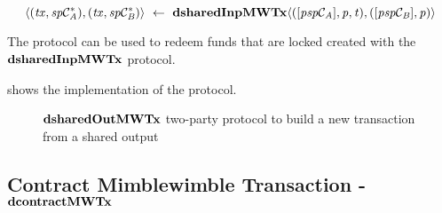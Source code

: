 \[ \langle (\mathit{tx}, \mathit{sp}\mathcal{C}_{\mathit{A}}^*), (\mathit{tx}, \mathit{sp}\mathcal{C}_{\mathit{B}}^*) \rangle ~\leftarrow~ \mathbf{dsharedInpMWTx} \langle([\mathit{psp}\mathcal{C}_{\mathit{A}}],\mathit{p},\mathit{t}), ([\mathit{psp}\mathcal{C}_{\mathit{B}}],\mathit{p}) \rangle \]

The protocol can be used to redeem funds that are locked created with the \\ $\mathbf{dsharedInpMWTx}$ protocol.

 shows the implementation of the protocol.

\begin{figure}
    \begin{center}
    \end{center}
    \caption{$\mathbf{dsharedOutMWTx}$ two-party protocol to build a new transaction from a shared output} \label{fig:d-shared-inp-mw-tx}
\end{figure}

\subsection{Contract Mimblewimble Transaction - $\mathbf{dcontractMWTx}$} \label{subsec:atom:script-mw-tx}

